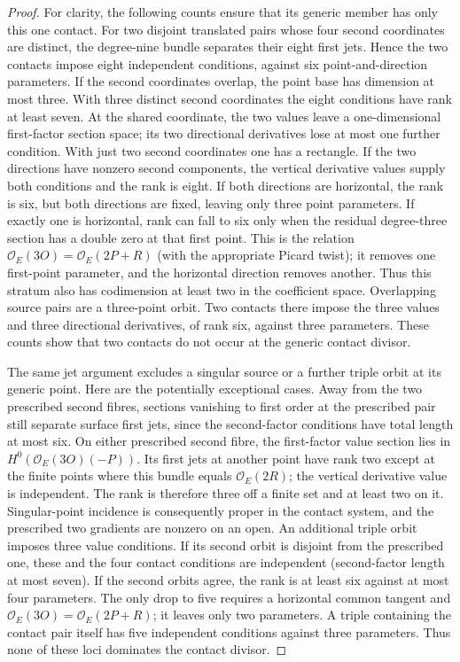 \begin{proof}
For clarity, the following counts ensure that its generic
member has only this one contact. For two disjoint translated
pairs whose four second coordinates are distinct, the
degree-nine bundle separates their eight first jets. Hence
the two contacts impose eight independent conditions, against
six point-and-direction parameters. If the second coordinates
overlap, the point base has dimension at most three. With three
distinct second coordinates the eight conditions have rank
at least seven. At the shared coordinate, the two values
leave a one-dimensional first-factor section space; its two
directional derivatives lose at most one further condition.
With just two second coordinates one has a rectangle. If the
two directions have nonzero second components, the vertical
derivative values supply both conditions and the rank is eight.
If both directions are horizontal, the rank is six, but both
directions are fixed, leaving only three point parameters.
If exactly one is horizontal, rank can fall to six only when
the residual degree-three section has a double zero at that
first point. This is the relation
$\mathcal O_E(3O)=\mathcal O_E(2P+R)$ (with the appropriate
Picard twist); it removes one first-point parameter, and the
horizontal direction removes another. Thus this stratum also
has codimension at least two in the coefficient space.
Overlapping source pairs are a three-point orbit. Two contacts
there impose the three values and three directional derivatives,
of rank six, against three parameters. These counts show that
two contacts do not occur at the generic contact divisor.

The same jet argument excludes a singular source or a further
triple orbit at its generic point. Here are the potentially
exceptional cases. Away from the two prescribed second fibres,
sections vanishing to first order at the prescribed pair still
separate surface first jets, since the second-factor conditions
have total length at most six. On either prescribed second
fibre, the first-factor value section lies in
$H^0(\mathcal O_E(3O)(-P))$. Its first jets at another point
have rank two except at the finite points where this bundle
equals $\mathcal O_E(2R)$; the vertical derivative value is
independent. The rank is therefore three off a finite set and
at least two on it. Singular-point incidence is consequently
proper in the contact system, and the prescribed two gradients
are nonzero on an open.
An additional triple orbit imposes three value conditions.
If its second orbit is disjoint from the prescribed one, these
and the four contact conditions are independent (second-factor
length at most seven). If the second orbits agree, the rank is
at least six against at most four parameters. The only drop
to five requires a horizontal common tangent and
$\mathcal O_E(3O)=\mathcal O_E(2P+R)$; it leaves only two
parameters. A triple containing the contact pair itself has
five independent conditions against three parameters.
Thus none of these loci dominates the contact divisor.


\end{proof}
